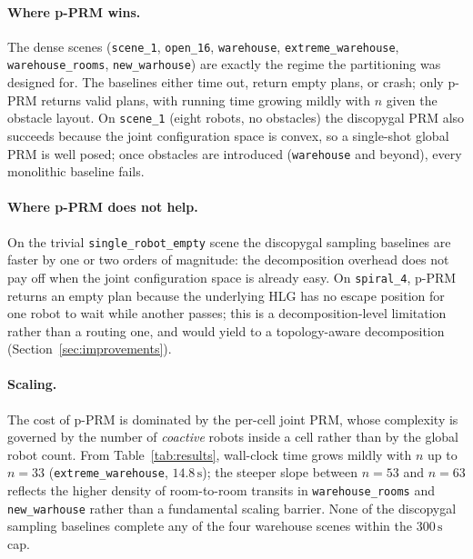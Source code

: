 \documentclass[12pt,a4paper]{article}
\begin{document}
    \paragraph{Where p-PRM wins.} The dense scenes (\texttt{scene\_1}, \texttt{open\_16}, \texttt{warehouse}, \texttt{extreme\_warehouse}, \texttt{warehouse\_rooms}, \texttt{new\_warhouse}) are exactly the regime the partitioning was designed for.
    The baselines either time out, return empty plans, or crash; only p-PRM returns valid plans, with running time growing mildly with $n$ given the obstacle layout.
    On \texttt{scene\_1} (eight robots, no obstacles) the discopygal PRM also succeeds because the joint configuration space is convex, so a single-shot global PRM is well posed; once obstacles are introduced (\texttt{warehouse} and beyond), every monolithic baseline fails.

    \paragraph{Where p-PRM does not help.} On the trivial \texttt{single\_robot\_empty} scene the discopygal sampling baselines are faster by one or two orders of magnitude: the decomposition overhead does not pay off when the joint configuration space is already easy. On \texttt{spiral\_4}, p-PRM returns an empty plan because the underlying HLG has no escape position for one robot to wait while another passes; this is a decomposition-level limitation rather than a routing one, and would yield to a topology-aware decomposition (Section~\ref{sec:improvements}).

    \paragraph{Scaling.} The cost of p-PRM is dominated by the per-cell joint PRM, whose complexity is governed by the number of \emph{coactive} robots inside a cell rather than by the global robot count. From Table~\ref{tab:results}, wall-clock time grows mildly with $n$ up to $n=33$ (\texttt{extreme\_warehouse}, $14.8\,\text{s}$); the steeper slope between $n=53$ and $n=63$ reflects the higher density of room-to-room transits in \texttt{warehouse\_rooms} and \texttt{new\_warhouse} rather than a fundamental scaling barrier.
    None of the discopygal sampling baselines complete any of the four warehouse scenes within the $300\,\text{s}$ cap.
\end{document}
